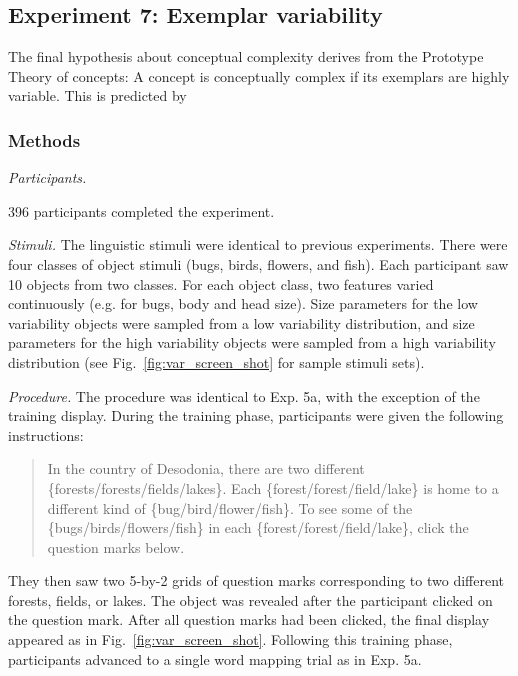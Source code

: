 \subsection{Experiment 7: Exemplar variability}
The final hypothesis about conceptual complexity derives from the Prototype Theory of concepts: A concept is conceptually complex if its exemplars are highly variable. This is predicted by 

\subsubsection{Methods}
{\it Participants.} 

396 participants completed the experiment.

{\it Stimuli.} 
The linguistic stimuli were identical to previous experiments. There were four classes of object stimuli (bugs, birds, flowers, and fish). Each participant saw 10 objects from two classes. For each object class, two features varied continuously (e.g. for bugs, body and head size). Size parameters for the low variability objects were  sampled from a low variability distribution, and size parameters for the high variability objects were  sampled from a high variability distribution (see Fig.\ \ref{fig:var_screen_shot} for sample stimuli sets).

{\it Procedure.} 
The procedure was identical to Exp. 5a, with the exception of the training display. During the training phase, participants were given the following instructions:

\begin{quote}
In the country of Desodonia, there are two different \{forests/forests/fields/lakes\}. Each \{forest/forest/field/lake\}  is home to a different kind of \{bug/bird/flower/fish\}. To see some of the \{bugs/birds/flowers/fish\} in each \{forest/forest/field/lake\}, click the question marks below.
\end{quote}

They then saw two 5-by-2 grids of question marks corresponding to two different forests, fields, or lakes. The object was revealed after the participant clicked on the question mark. After all question marks had been clicked, the final display appeared as in Fig.\ \ref{fig:var_screen_shot}. Following this training phase, participants advanced to a single word mapping trial as in Exp. 5a. 

